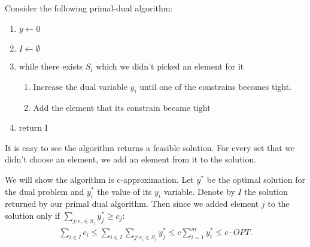 \documentclass{article}
\begin{document}
\begin{enumerate}
Consider the following primal-dual algorithm:
\begin{enumerate}
    \item $y \gets $0
    \item $I \leftarrow \emptyset$
    \item while there exists $S_i$ which we didn't picked an element for it
    \begin{enumerate}
        \item Increase the dual variable $y_i$ until one of the constrains becomes tight.
        \item Add the element that its constrain became tight
    \end{enumerate}
    \item return I
\end{enumerate}

It is easy to see the algorithm returns a feasible solution. For every set that we didn't choose an element, we add an element from it to the solution.

We will show the algorithm is c-approximation. Let $y^*$ be the optimal solution for the dual problem and $y^*_i$ the value of its $y_i$ variable. Denote by $I$ the solution returned by our primal dual algorithm. Then since we added element $j$ to the solution  only if $\sum_{j : e_i \in S_j} y^*_j \geq c_j$:
\begin{align*}
    \sum_{i \in I} c_i \leq \sum_{i \in I} \sum_{j : e_i \in S_j} y^*_j \leq c \sum_{i=1}^{m} y^*_i \leq c \cdot OPT.
\end{align*}
\end{enumerate}
\end{document}
